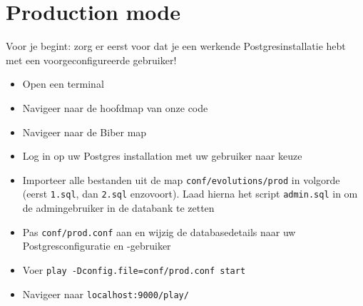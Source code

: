 \documentclass[11pt,a4paper]{article}
\begin{document}
\section{Production mode}
Voor je begint: zorg er eerst voor dat je een werkende Postgresinstallatie hebt met een voorgeconfigureerde gebruiker!

\begin{itemize}
\item Open een terminal
\item Navigeer naar de hoofdmap van onze code
\item Navigeer naar de Biber map
\item Log in op uw Postgres installation met uw gebruiker naar keuze
\item Importeer alle bestanden uit de map \texttt{conf/evolutions/prod} in volgorde (eerst \texttt{1.sql}, dan \texttt{2.sql} enzovoort). Laad hierna het script \texttt{admin.sql} in om de admingebruiker in de databank te zetten
\item Pas \texttt{conf/prod.conf} aan en wijzig de databasedetails naar uw Postgresconfiguratie en -gebruiker
\item Voer \texttt{play -Dconfig.file=conf/prod.conf start}
\item Navigeer naar \texttt{localhost:9000/play/}
\end{itemize}
\end{document}
